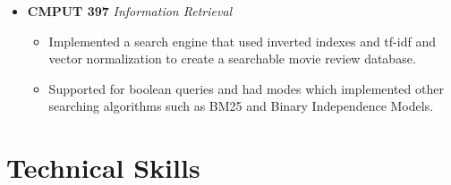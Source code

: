 \documentclass[11pt,a4paper,sans]{moderncv}        %
\begin{document}
\begin{itemize}
\item{\textbf{CMPUT 397} \textit{Information Retrieval}

\vspace{3pt}

\begin{itemize}
    \item Implemented a search engine that used inverted indexes and tf-idf and vector normalization to create a searchable movie review database.
    \item Supported for boolean queries and had modes which implemented other searching algorithms such as BM25 and Binary Independence Models.
\end{itemize}
\vspace{6pt}
}





\end{itemize}

\section{Technical Skills}
\end{document}
